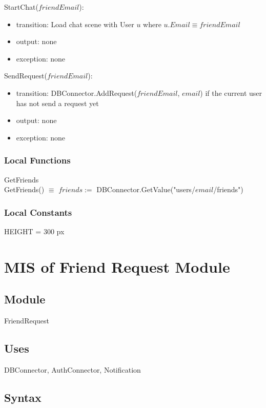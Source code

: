 \documentclass[12pt, titlepage]{article}
\begin{document}
\noindent StartChat($friendEmail$):
\begin{itemize}
\item transition: Load chat scene with User $u$ where $u.Email \equiv friendEmail$
\item output: none
\item exception: none
\end{itemize}

\noindent SendRequest($friendEmail$):
\begin{itemize}
\item transition: DBConnector.AddRequest($friendEmail$, $email$) if the current user has not send a request yet
\item output: none
\item exception: none
\end{itemize}

\subsubsection{Local Functions}

GetFriends \\
GetFriends() $\equiv$ $friends :=$ DBConnector.GetValue("users/$email$/friends")

\subsubsection{Local Constants}
HEIGHT = 300 px

\newpage

\section{MIS of Friend Request Module} \label{mFR}

\subsection{Module}

FriendRequest

\subsection{Uses}

DBConnector, AuthConnector, Notification

\subsection{Syntax}
\end{document}
